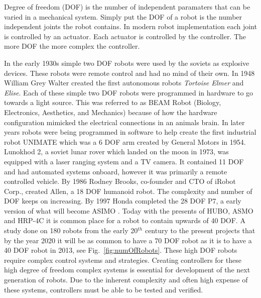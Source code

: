 Degree of freedom (DOF) is the number of independent paramaters that can be varied in a mechanical system.
Simply put the DOF of a robot is the number independent joints the robot contains.
In modern robot implementation each joint is controlled by an actuator.
Each actuator is controlled by the controller.
The more DOF the more complex the controller.

In the early 1930s simple two DOF robots were used by the soviets as explosive devices\cite{robotTelitankSpringer2013military}.
These robots were remote control and had no mind of their own.
In 1948 William Grey Walter created the first autonomous robots \textit{Tortoise Elmer} and \textit{Elise}\cite{robotElmer}.
Each of these simple two DOF robots were programmed in hardware to go towards a light source.  
This was referred to as BEAM Robot (Biology, Electronics, Aesthetics, and Mechanics) because of how the hardware configuration mimicked the electrical connections in an animals brain.
In later years robots were being programmed in software to help create the first industrial robot UNIMATE which was a 6 DOF arm created by General Motors in 1954\cite{handbookOnRobotics2008springer}.  
Lunokhod 2, a soviet lunar rover which landed on the moon in 1973, was equipped with a laser ranging system and a TV camera.
It contained 11 DOF and had automated systems onboard, however it was primarily a remote controlled vehicle.
By 1986 Rodney Brooks, co-founder and CTO of iRobot Corp., created Allen, a 18 DOF humanoid robot.
The complexity and number of DOF keeps on increasing.
By 1997 Honda completed the 28 DOF P7, a early version of what will become ASIMO \cite{robotsAsimo1041641}.
Today with the presents of HUBO, ASMO and HRP-4C it is common place for a robot to contain upwards of 40 DOF.
A study done on 180 robots from the early 20$^{th}$ century to the present projects that by the year 2020 it will be as common to have a 70 DOF robot as it is to have a 40 DOF robot in 2013, see Fig.~\ref{fig:numOfRobots}. 
These high DOF robots require complex control systems and strategies.
Creating controllers for these high degree of freedom complex systems is essential for development of the next generation of robots.
Due to the inherent complexity and often high expense of these systems, controllers must be able to be tested and verified.



